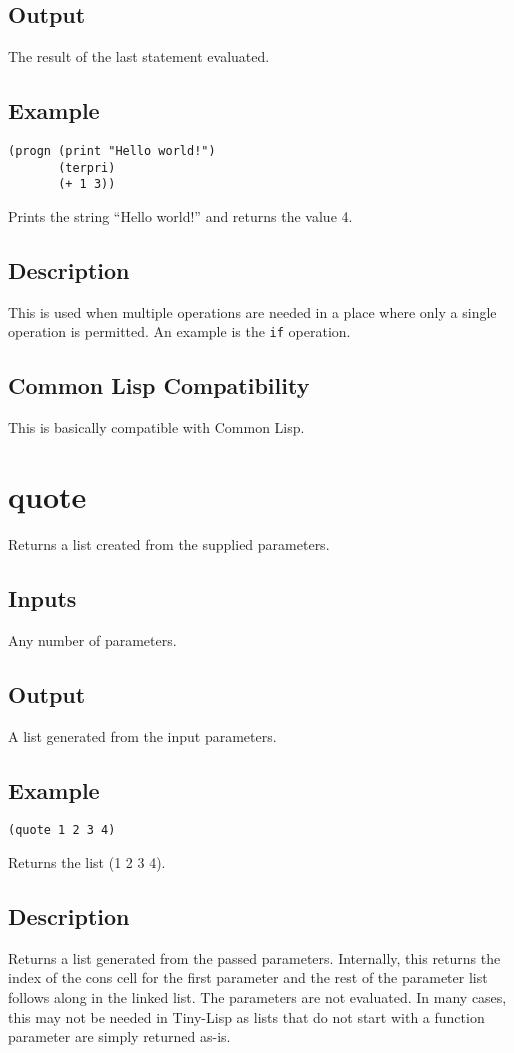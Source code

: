 \documentclass[10pt, openany]{book}
\newcommand{\keyword}[1]{\texttt{#1}}
\newcommand{\tl}{Tiny-Lisp}
\newcommand{\cl}{Common Lisp}
\begin{document}
\subsection{Output}
The result of the last statement evaluated.
\subsection{Example}
\begin{lstlisting}
(progn (print "Hello world!")
       (terpri)
       (+ 1 3))
\end{lstlisting}
Prints the string ``Hello world!'' and returns the value 4.
\subsection{Description}
This is used when multiple operations are needed in a place where only a single operation is permitted.  An example is the \keyword{if} operation.
\subsection{Common Lisp Compatibility}
This is basically compatible with \cl.

\section{quote}
Returns a list created from the supplied parameters.
\subsection{Inputs}
Any number of parameters.
\subsection{Output}
A list generated from the input parameters.
\subsection{Example}
\begin{lstlisting}
(quote 1 2 3 4)
\end{lstlisting}
Returns the list (1 2 3 4).
\subsection{Description}
Returns a list generated from the passed parameters.  Internally, this returns the index of the cons cell for the first parameter and the rest of the parameter list follows along in the linked list.  The parameters are not evaluated.  In many cases, this may not be needed in \tl{} as lists that do not start with a function parameter are simply returned as-is.
\end{document}
